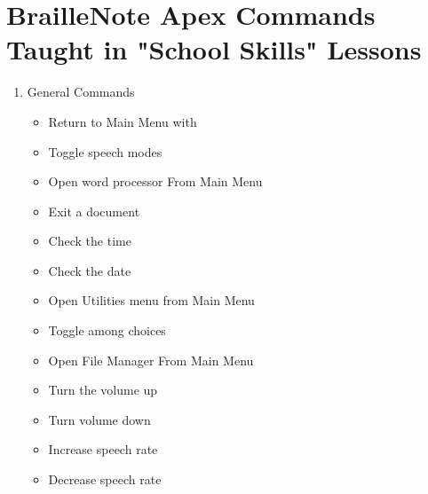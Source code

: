 \documentclass[10pt,letterpaper,twoside]{report}
\begin{document}
\section{BrailleNote Apex Commands Taught in "School Skills" Lessons}
\begin{enumerate}
	\item General Commands
	      \begin{itemize}
		      \item Return to Main Menu with 
		      \item Toggle speech modes 
		      \item Open word processor From Main Menu 
		      \item Exit a document 
		      \item Check the time 
		      \item Check the date 
		      \item Open Utilities menu from Main Menu 
		      \item Toggle among choices 
		      \item Open File Manager From Main Menu 
		      \item Turn the volume up 
		      \item Turn volume down 
		      \item Increase speech rate 
		      \item Decrease speech rate 

\end{itemize}
\end{enumerate}
\end{document}
